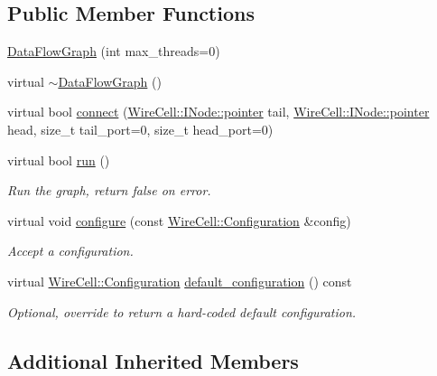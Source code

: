 \subsection*{Public Member Functions}
\begin{DoxyCompactItemize}
\item 
\hyperlink{class_wire_cell_tbb_1_1_data_flow_graph_adc38880818e49339df3264239348f0b0}{Data\+Flow\+Graph} (int max\+\_\+threads=0)
\item 
virtual \hyperlink{class_wire_cell_tbb_1_1_data_flow_graph_ae29f042f9af6c5bfa178c534c004a702}{$\sim$\+Data\+Flow\+Graph} ()
\item 
virtual bool \hyperlink{class_wire_cell_tbb_1_1_data_flow_graph_a37432ebdd10107bbcc99205893c2587b}{connect} (\hyperlink{class_wire_cell_1_1_interface_a09c548fb8266cfa39afb2e74a4615c37}{Wire\+Cell\+::\+I\+Node\+::pointer} tail, \hyperlink{class_wire_cell_1_1_interface_a09c548fb8266cfa39afb2e74a4615c37}{Wire\+Cell\+::\+I\+Node\+::pointer} head, size\+\_\+t tail\+\_\+port=0, size\+\_\+t head\+\_\+port=0)
\item 
virtual bool \hyperlink{class_wire_cell_tbb_1_1_data_flow_graph_ae8e14d9ad578b85a9e6faf4db69cc31b}{run} ()
\begin{DoxyCompactList}\small\item\em Run the graph, return false on error. \end{DoxyCompactList}\item 
virtual void \hyperlink{class_wire_cell_tbb_1_1_data_flow_graph_a2c4fe387fa89d26296925548ee7ff1ab}{configure} (const \hyperlink{namespace_wire_cell_a9f705541fc1d46c608b3d32c182333ee}{Wire\+Cell\+::\+Configuration} \&config)
\begin{DoxyCompactList}\small\item\em Accept a configuration. \end{DoxyCompactList}\item 
virtual \hyperlink{namespace_wire_cell_a9f705541fc1d46c608b3d32c182333ee}{Wire\+Cell\+::\+Configuration} \hyperlink{class_wire_cell_tbb_1_1_data_flow_graph_ae1dd804621d2e8f12456f40852f4db2e}{default\+\_\+configuration} () const
\begin{DoxyCompactList}\small\item\em Optional, override to return a hard-\/coded default configuration. \end{DoxyCompactList}\end{DoxyCompactItemize}
\subsection*{Additional Inherited Members}



